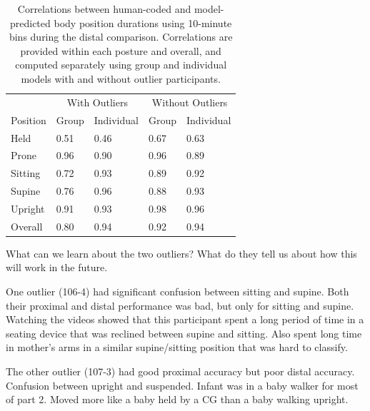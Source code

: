\documentclass[
  man]{apa6}
\begin{document}
\begin{table}[tbp]

\begin{center}
\begin{threeparttable}

\caption{\label{tab:pt2binstable}Correlations between human-coded and model-predicted body position durations using 10-minute bins during the distal comparison. Correlations are provided within each posture and overall, and computed separately using group and individual models with and without outlier participants.}

\begin{tabular}{lllll}
\toprule
 & \multicolumn{2}{c}{With Outliers} & \multicolumn{2}{c}{Without Outliers} \\
\cmidrule(r){2-3} \cmidrule(r){4-5}
Position & Group & Individual & Group & Individual\\
\midrule
Held & 0.51 & 0.46 & 0.67 & 0.63\\
Prone & 0.96 & 0.90 & 0.96 & 0.89\\
Sitting & 0.72 & 0.93 & 0.89 & 0.92\\
Supine & 0.76 & 0.96 & 0.88 & 0.93\\
Upright & 0.91 & 0.93 & 0.98 & 0.96\\ \midrule
Overall & 0.80 & 0.94 & 0.92 & 0.94\\
\bottomrule
\end{tabular}

\end{threeparttable}
\end{center}

\end{table}

What can we learn about the two outliers? What do they tell us about how this will work in the future.

One outlier (106-4) had significant confusion between sitting and supine. Both their proximal and distal performance was bad, but only for sitting and supine. Watching the videos showed that this participant spent a long period of time in a seating device that was reclined between supine and sitting. Also spent long time in mother's arms in a similar supine/sitting position that was hard to classify.

The other outlier (107-3) had good proximal accuracy but poor distal accuracy. Confusion between upright and suspended. Infant was in a baby walker for most of part 2. Moved more like a baby held by a CG than a baby walking upright.
\end{document}
